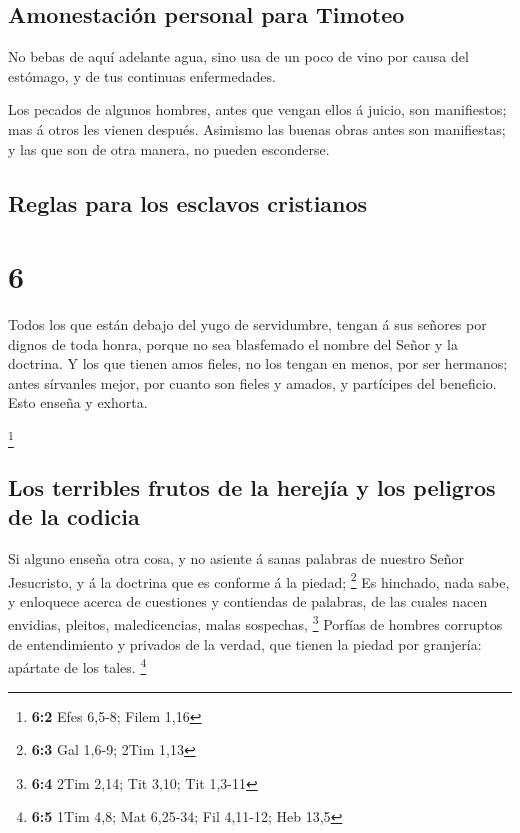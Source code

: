\hypertarget{amonestaciuxf3n-personal-para-timoteo}{%
\subsection{Amonestación personal para
Timoteo}\label{amonestaciuxf3n-personal-para-timoteo}}

 No bebas de aquí adelante agua, sino usa de un poco de
vino por causa del estómago, y de tus continuas enfermedades.

 Los pecados de algunos hombres, antes que vengan ellos á
juicio, son manifiestos; mas á otros les vienen después. 
Asimismo las buenas obras antes son manifiestas; y las que son de otra
manera, no pueden esconderse.

\hypertarget{reglas-para-los-esclavos-cristianos}{%
\subsection{Reglas para los esclavos
cristianos}\label{reglas-para-los-esclavos-cristianos}}

\hypertarget{section-5}{%
\section{6}\label{section-5}}

 Todos los que están debajo del yugo de servidumbre,
tengan á sus señores por dignos de toda honra, porque no sea blasfemado
el nombre del Señor y la doctrina.  Y los que tienen amos
fieles, no los tengan en menos, por ser hermanos; antes sírvanles mejor,
por cuanto son fieles y amados, y partícipes del beneficio. Esto enseña
y exhorta.

\footnote{\textbf{6:2} Efes 6,5-8; Filem 1,16}

\hypertarget{los-terribles-frutos-de-la-herejuxeda-y-los-peligros-de-la-codicia}{%
\subsection{Los terribles frutos de la herejía y los peligros de la
codicia}\label{los-terribles-frutos-de-la-herejuxeda-y-los-peligros-de-la-codicia}}

 Si alguno enseña otra cosa, y no asiente á sanas palabras
de nuestro Señor Jesucristo, y á la doctrina que es conforme á la
piedad; \footnote{\textbf{6:3} Gal 1,6-9; 2Tim 1,13}  Es
hinchado, nada sabe, y enloquece acerca de cuestiones y contiendas de
palabras, de las cuales nacen envidias, pleitos, maledicencias, malas
sospechas, \footnote{\textbf{6:4} 2Tim 2,14; Tit 3,10; Tit 1,3-11}
 Porfías de hombres corruptos de entendimiento y privados
de la verdad, que tienen la piedad por granjería: apártate de los tales.
\footnote{\textbf{6:5} 1Tim 4,8; Mat 6,25-34; Fil 4,11-12; Heb 13,5}

